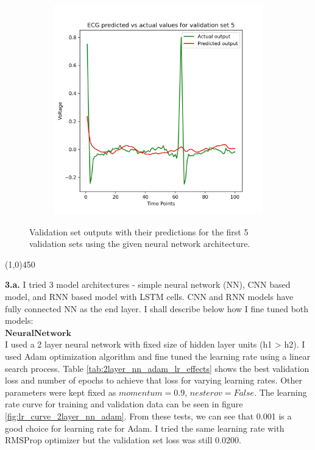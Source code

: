 \documentclass[11pt]{article}
\newcommand{\mbf}[1]{{\mathbf{#1}}}
\begin{document}
\begin{figure}
\begin{subfigure}[b]{0.18\textwidth}
		\label{fig:val_pred_given_nn_3}
	\end{subfigure}
	\begin{subfigure}[b]{0.18\textwidth}
		\centering
		\includegraphics[width=\textwidth]{prediction_plot_5.jpg}
		\label{fig:val_pred_given_nn_3}
	\end{subfigure}
	\caption{Validation set outputs with their predictions for the first 5 validation sets using the given neural network architecture.}
	\label{fig:five_graphs}
\end{figure}

\begin{center}
	\line(1,0){450}
\end{center}

\textbf{3.a.}
I tried 3 model architectures - simple neural network (NN), CNN based model, and RNN based model with LSTM cells. CNN and RNN models have fully connected NN as the end layer. I shall describe below how I fine tuned both models: \\

$\mbf{Neural Network}$ \\

I used a 2 layer neural network with fixed size of hidden layer units (h1 > h2). I used Adam optimization algorithm and fine tuned the learning rate using a linear search process. Table \ref{tab:2layer_nn_adam_lr_effects} shows the best validation loss and number of epochs to achieve that loss for varying learning rates. Other parameters were kept fixed as $momentum=0.9$, $nesterov=False$. The learning rate curve for training and validation data can be seen in figure \ref{fig:lr_curve_2layer_nn_adam}. From these tests, we can see that 0.001 is a good choice for learning rate for Adam. I tried the same learning rate with RMSProp optimizer but the validation set loss was still 0.0200. \\
\end{document}
